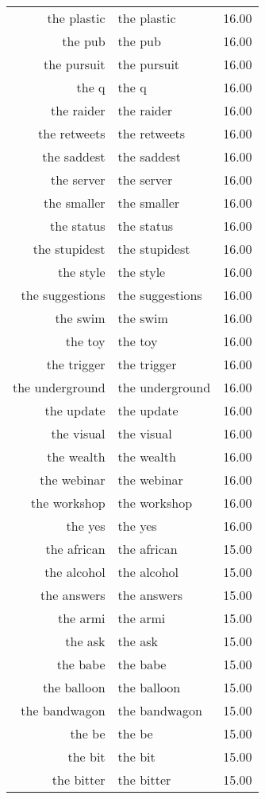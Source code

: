 \begin{table}[ht]
\begin{tabular}{rlr}
  the plastic & the plastic & 16.00 \\ 
  the pub & the pub & 16.00 \\ 
  the pursuit & the pursuit & 16.00 \\ 
  the q & the q & 16.00 \\ 
  the raider & the raider & 16.00 \\ 
  the retweets & the retweets & 16.00 \\ 
  the saddest & the saddest & 16.00 \\ 
  the server & the server & 16.00 \\ 
  the smaller & the smaller & 16.00 \\ 
  the status & the status & 16.00 \\ 
  the stupidest & the stupidest & 16.00 \\ 
  the style & the style & 16.00 \\ 
  the suggestions & the suggestions & 16.00 \\ 
  the swim & the swim & 16.00 \\ 
  the toy & the toy & 16.00 \\ 
  the trigger & the trigger & 16.00 \\ 
  the underground & the underground & 16.00 \\ 
  the update & the update & 16.00 \\ 
  the visual & the visual & 16.00 \\ 
  the wealth & the wealth & 16.00 \\ 
  the webinar & the webinar & 16.00 \\ 
  the workshop & the workshop & 16.00 \\ 
  the yes & the yes & 16.00 \\ 
  the african & the african & 15.00 \\ 
  the alcohol & the alcohol & 15.00 \\ 
  the answers & the answers & 15.00 \\ 
  the armi & the armi & 15.00 \\ 
  the ask & the ask & 15.00 \\ 
  the babe & the babe & 15.00 \\ 
  the balloon & the balloon & 15.00 \\ 
  the bandwagon & the bandwagon & 15.00 \\ 
  the be & the be & 15.00 \\ 
  the bit & the bit & 15.00 \\ 
  the bitter & the bitter & 15.00 \\ 

\end{tabular}
\end{table}
